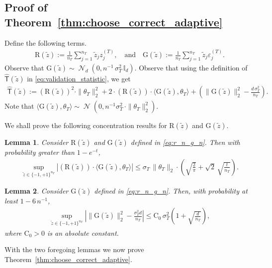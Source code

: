 \documentclass[10pt]{article}
\newtheorem{lemma}{Lemma}
\newcommand{\Id}{\mathbb I}
\newcommand{\wh}{\widehat}
\newcommand{\wt}{\widetilde}
\DeclareMathOperator{\dnorm}{\mathcal N}
\newcommand{\trg}{T}
\newcommand{\thetaT}{\theta_{\trg}}
\newcommand{\nT}{n_{\trg}}
\newcommand{\sigmaT}{\sigma_{\trg}}
\newcommand{\ztar}{z^{(\trg)}}
\newcommand{\rmT}{\mathsf{T}}
\begin{document}
\subsection{Proof of Theorem~\ref{thm:choose_correct_adaptive}}
\label{sec:proof_thm_2}
Define the following terms.
\begin{align}
\label{eq:r_n_g_n}
    \mathrm R(\wt z):=\frac{1}{\nT}\sum_{j =1}^{\nT} \wt z_j\ztar_j, \quad \mbox{and} \quad \mathrm G(\wt z):=\frac{1}{\nT}\sum_{j =1}^{\nT} \wt z_j\varepsilon^{(\trg)}_j.
\end{align}
Observe that $\mathrm G(\wt z) \sim \dnorm_d(0,n^{-1}\,\sigmaT^2\,\Id_d)$. Observe that using the definition of $\wh{\rmT}(\wt z)$ in \eqref{eq:validation_statistic}, we get
\begin{align}
\label{eq:triangle_t_n}
    \wh{\rmT}(\wt z):= (\mathrm R(\wt z))^2\cdot\|\thetaT\|^2_2+2\cdot(\mathrm R(\wt z))\cdot\langle \mathrm G(\wt z),\thetaT \rangle + \left(\|\mathrm G(\wt z)\|^2_2-\frac{d\,\sigmaT^2}{\nT}\right).
\end{align}
Note that $\langle \mathrm G(\wt z),\thetaT \rangle \sim \dnorm(0,n^{-1}\sigmaT^2\,\cdot\|\thetaT\|^2_2)$.

We shall prove the following concentration results for $\mathrm R(\wt z)$ and $\mathrm G(\wt z)$.

\begin{lemma}
    \label{lem:uniform_conc_r_n}
    Consider $\mathrm R(\wt z)$ and $\mathrm G(\wt z)$ defined in \eqref{eq:r_n_g_n}. Then with probability greater than $1-e^{-t}$, 
    \begin{align}
        \sup_{\wt z \in \{-1,+1\}^{\nT}}\left|(\mathrm R(\wt z))\cdot\langle \mathrm G(\wt z),\thetaT \rangle\right| \le \sigmaT\,\|\thetaT\|_2\cdot\left(\sqrt{\frac{2}{\pi}}+\sqrt{2}\,\sqrt{\frac{t}{\nT}}\right) .
    \end{align}
\end{lemma}

\begin{lemma}
    \label{lem:uniform_conc_g_n}
    Consider $\mathrm G(\wt z)$ defined in \eqref{eq:r_n_g_n}. Then, with probability at least $1-6\,n^{-1}$,
\begin{align}
    \sup_{\wt z\in\{-1,+1\}^{\nT}}\left|\|\mathrm G(\wt z)\|_2^2-\frac{\sigmaT^2d}{\nT}\right| \le\mathrm C_0\,\sigmaT^2\left(1+\sqrt{\frac{d}{\nT}}\right),
\end{align}
where $\mathrm C_0>0$ is an absolute constant.
\end{lemma}
With the two foregoing lemmas we now prove Theorem~\ref{thm:choose_correct_adaptive}.
\end{document}
